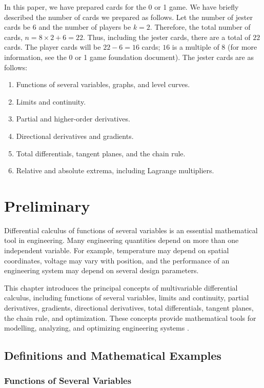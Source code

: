 \documentclass[a4paper,12pt]{article}
\theoremstyle{mystyle}
\numberwithin{equation}{section}
\numberwithin{theorem}{section}
\numberwithin{proposition}{section}
\numberwithin{example}{section}
\numberwithin{remark}{section}
\numberwithin{lemma}{section}
\numberwithin{corollary}{section}
\numberwithin{definition}{section}
\begin{document}
In this paper, we have prepared cards for the 0 or 1 game. We have briefly described the number of cards we prepared as follows. Let the number of jester cards be $6$ and the number of players be $k = 2$. Therefore, the total number of cards, $n = 8 \times 2 + 6 = 22$. Thus, including the jester cards, there are a total of $22$ cards. The player cards will be $22 - 6 = 16$ cards; $16$ is a multiple of $8$ (for more information, see the 0 or 1 game foundation document). The jester cards are as follows: \begin{enumerate}[label=\Alph*.]
  \item Functions of several variables, graphs, and
  level curves.
  \item Limits and continuity.
  \item Partial and higher-order derivatives.
  \item Directional derivatives and gradients.
  \item Total differentials, tangent planes, and
  the chain rule.
  \item Relative and absolute extrema, including
  Lagrange multipliers.
\end{enumerate}
\section{Preliminary}
\label{S:2}
Differential calculus of functions of several variables
is an essential mathematical tool in engineering.
Many engineering quantities depend on more than one
independent variable. For example, temperature may
depend on spatial coordinates, voltage may vary with
position, and the performance of an engineering system
may depend on several design parameters.

This chapter introduces the principal concepts of
multivariable differential calculus, including functions
of several variables, limits and continuity, partial
derivatives, gradients, directional derivatives, total
differentials, tangent planes, the chain rule, and
optimization. These concepts provide mathematical
tools for modelling, analyzing, and optimizing
engineering systems \cite{openstax2022}.

\subsection{Definitions and Mathematical Examples}

\subsubsection{Functions of Several Variables}
\end{document}
